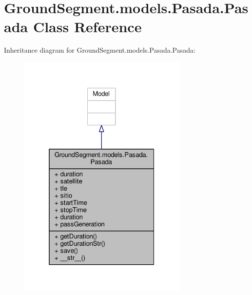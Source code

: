 \hypertarget{class_ground_segment_1_1models_1_1_pasada_1_1_pasada}{}\section{Ground\+Segment.\+models.\+Pasada.\+Pasada Class Reference}
\label{class_ground_segment_1_1models_1_1_pasada_1_1_pasada}


Inheritance diagram for Ground\+Segment.\+models.\+Pasada.\+Pasada\+:\nopagebreak
\begin{figure}[H]
\begin{center}
\leavevmode
\includegraphics[width=241pt]{class_ground_segment_1_1models_1_1_pasada_1_1_pasada__inherit__graph}
\end{center}
\end{figure}


